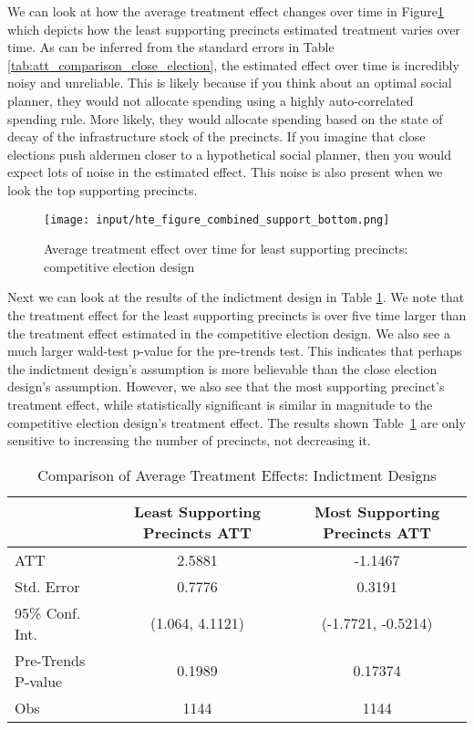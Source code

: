 We can look at how the average treatment effect changes over time in Figure\ref{fig:att_comparison_close_election_bottom} which depicts how the least supporting precincts estimated treatment varies over time.
As can be inferred from the standard errors in Table \ref{tab:att_comparison_close_election}, the estimated effect over time is incredibly noisy and unreliable.
This is likely because if you think about an optimal social planner, they would not allocate spending using a highly auto-correlated spending rule.
More likely, they would allocate spending based on the state of decay of the infrastructure stock of the precincts.
If you imagine that close elections push aldermen closer to a hypothetical social planner, then you would expect lots of noise in the estimated effect.
This noise is also present when we look the top supporting precincts.
\begin{figure}[ht]
    \centering
    \texttt{[image: input/hte\_figure\_combined\_support\_bottom.png]}
    \caption{Average treatment effect over time for least supporting precincts: competitive election design}
    \label{fig:att_comparison_close_election_bottom}
\end{figure}



Next we can look at the results of the indictment design in Table \ref{tab:att_comparison_corruption}.
We note that the treatment effect for the least supporting precincts is over five time larger than the treatment effect estimated in the competitive election design.
We also see a much larger wald-test p-value for the pre-trends test.
This indicates that perhaps the indictment design's assumption is more believable than the close election design's assumption.
However, we also see that the most supporting precinct's treatment effect, while statistically significant is similar in magnitude to the competitive election design's treatment effect.
The results shown Table~\ref{tab:att_comparison_corruption} are only sensitive to increasing the number of precincts, not decreasing it. 


\begin{table}[H]
    \centering
    \caption{Comparison of Average Treatment Effects: Indictment Designs}
    \label{tab:att_comparison_corruption}
    \begin{tabular}{lcc}
    \hline
     & Least Supporting Precincts ATT & Most Supporting Precincts ATT \\
    \hline
    ATT & 2.5881 & -1.1467 \\
    Std. Error & 0.7776 & 0.3191 \\
    95\% Conf. Int. & (1.064, 4.1121) & (-1.7721, -0.5214) \\
    Pre-Trends P-value & 0.1989 & 0.17374 \\
    Obs & 1144 & 1144 \\
    \hline
    \end{tabular}
\end{table}

